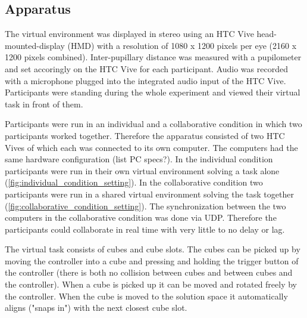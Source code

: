\documentclass{article}
\begin{document}
\subsection{Apparatus}
The virtual environment was displayed in stereo using an HTC Vive head-mounted-display (HMD) with a resolution of 1080 x 1200 pixels per eye (2160 x 1200 pixels combined). Inter-pupillary distance was measured with a pupilometer and set accoringly on the HTC Vive for each participant. Audio was recorded with a microphone plugged into the integrated audio input of the HTC Vive. Participants were standing during the whole experiment and viewed their virtual task in front of them.

Participants were run in an individual and a collaborative condition in which two participants worked together. Therefore the apparatus consisted of two HTC Vives of which each was connected to its own computer. The computers had the same hardware configuration (list PC specs?). In the individual condition participants were run in their own virtual environment solving a task alone (\ref{fig:individual_condition_setting}). In the collaborative condition two participants were run in a shared virtual environment solving the task together (\ref{fig:collaborative_condition_setting}). The synchronization between the two computers in the collaborative condition was done via UDP. Therefore the participants could collaborate in real time with very little to no delay or lag.

The virtual task consists of cubes and cube slots. The cubes can be picked up by moving the controller into a cube and pressing and holding the trigger button of the controller (there is both no collision between cubes and between cubes and the controller). When a cube is picked up it can be moved and rotated freely by the controller. When the cube is moved to the solution space it  automatically aligns ("snaps in") with the next closest cube slot.


\end{document}
